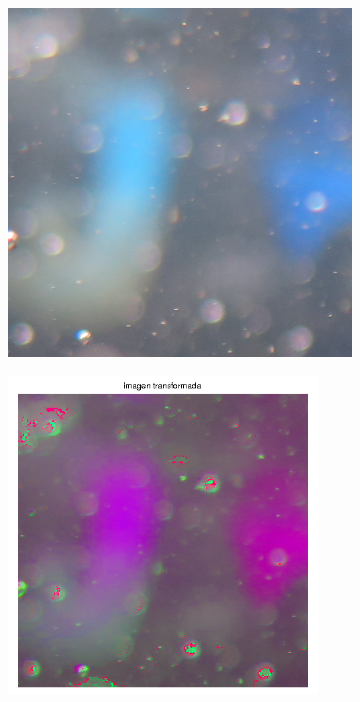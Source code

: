 \documentclass{article}
\begin{document}
\begin{figure}[H]
	\begin{subfigure}{0.5\textwidth}
	\centering
        \includegraphics[scale=0.6]{1923xx.png}
    \end{subfigure}\hfill
	\begin{subfigure}{0.5\textwidth}
	\centering
        \includegraphics[width=0.9\textwidth]{1923-transformada-90-2x-log.png}
    \end{subfigure}\hfill
\end{figure}\hfill
\end{document}
